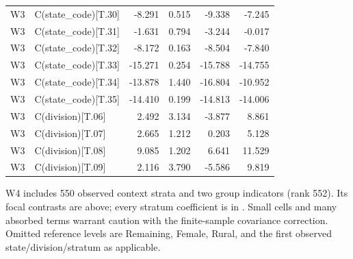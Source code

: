 \documentclass[11pt,a4paper]{report}
\begin{document}
\begin{longtable}{l>{\raggedright\arraybackslash}p{6cm}rrrr}
W3 & C(state\_code)[T.30] & -8.291 & 0.515 & -9.338 & -7.245 \\
W3 & C(state\_code)[T.31] & -1.631 & 0.794 & -3.244 & -0.017 \\
W3 & C(state\_code)[T.32] & -8.172 & 0.163 & -8.504 & -7.840 \\
W3 & C(state\_code)[T.33] & -15.271 & 0.254 & -15.788 & -14.755 \\
W3 & C(state\_code)[T.34] & -13.878 & 1.440 & -16.804 & -10.952 \\
W3 & C(state\_code)[T.35] & -14.410 & 0.199 & -14.813 & -14.006 \\
W3 & C(division)[T.06] & 2.492 & 3.134 & -3.877 & 8.861 \\
W3 & C(division)[T.07] & 2.665 & 1.212 & 0.203 & 5.128 \\
W3 & C(division)[T.08] & 9.085 & 1.202 & 6.641 & 11.529 \\
W3 & C(division)[T.09] & 2.116 & 3.790 & -5.586 & 9.819 \\
\end{longtable}\endgroup
W4 includes 550 observed context strata and two group indicators (rank 552). Its focal contrasts are above; every stratum coefficient is in . Small cells and many absorbed terms warrant caution with the finite-sample covariance correction. Omitted reference levels are Remaining, Female, Rural, and the first observed state/division/stratum as applicable.
\begingroup\footnotesize\setlength{\tabcolsep}{4pt}
\end{document}
